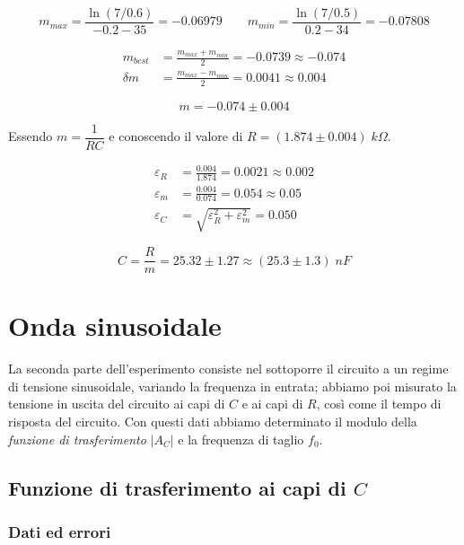 \documentclass[11pt, a4paper]{article}
\numberwithin{equation}{section} %
\begin{document}
\begin{equation*}
    m_{max} = \frac{\ln(7/0.6)}{- 0.2 - 35} = - 0.06979
    \qquad
    m_{min} = \frac{\ln(7/0.5)}{0.2 - 34} = - 0.07808
\end{equation*}

\begin{align*}
    m_{best} &= \frac{m_{max} + m_{min}}{2} = - 0.0739 \approx - 0.074 \\
    \delta m &= \frac{m_{max} - m_{min}}{2} = 0.0041 \approx 0.004
\end{align*}

\begin{equation}
    m = - 0.074 \pm 0.004
\end{equation}

\newpage

Essendo \(m = \dfrac{1}{RC}\) e conoscendo il valore di \(R = (1.874 \pm 0.004) \; \unit{k\Omega}\).

\begin{align*}
    \varepsilon_R &= \frac{0.004}{1.874} = 0.0021 \approx 0.002 \\
    \varepsilon_m &= \frac{0.004}{0.074} = 0.054 \approx 0.05 \\
    \varepsilon_C &= \sqrt{\varepsilon_R^{2} + \varepsilon_m^{2}} = 0.050 %
\end{align*}

\begin{equation}
    C = \frac{R}{m} = 25.32 \pm 1.27 \approx (25.3 \pm 1.3) \; \unit{nF}
\end{equation}

\section{Onda sinusoidale}

La seconda parte dell'esperimento consiste nel sottoporre il circuito a un regime di tensione sinusoidale, variando la frequenza in entrata; abbiamo poi misurato la tensione in uscita del circuito ai capi di $C$ e ai capi di $R$, così come il tempo di risposta del circuito. Con questi dati abbiamo determinato il modulo della \emph{funzione di trasferimento} $|A_{C}|$ e la frequenza di taglio $f_{0}$.

\subsection{Funzione di trasferimento ai capi di $C$}

\subsubsection{Dati ed errori}
\end{document}
